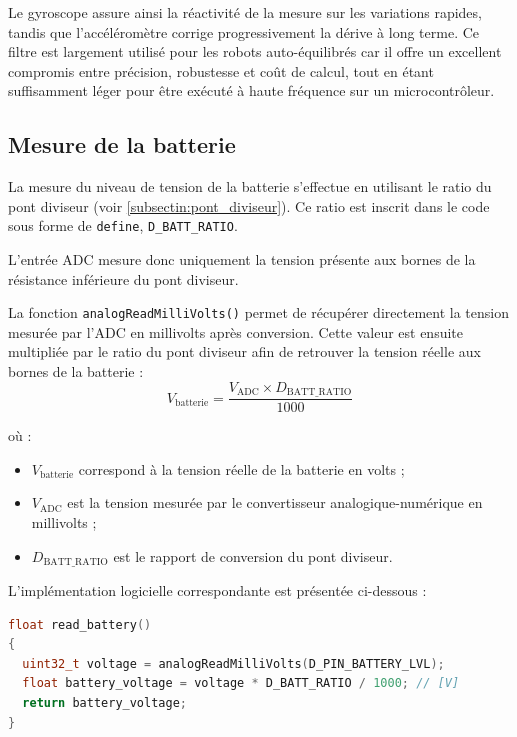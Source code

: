 Le gyroscope assure ainsi la réactivité de la mesure sur les variations rapides, tandis que l'accéléromètre corrige progressivement la dérive à long terme. Ce filtre est largement utilisé pour les robots auto-équilibrés car il offre un excellent compromis entre précision, robustesse et coût de calcul, tout en étant suffisamment léger pour être exécuté à haute fréquence sur un microcontrôleur.

\subsection{Mesure de la batterie}

La mesure du niveau de tension de la batterie s'effectue en utilisant le ratio du pont diviseur (voir \ref{subsectin:pont_diviseur}). Ce ratio est inscrit dans le code sous forme de \texttt{define}, \texttt{D\_BATT\_RATIO}.

L'entrée ADC mesure donc uniquement la tension présente aux bornes de la résistance inférieure du pont diviseur. 

La fonction \texttt{analogReadMilliVolts()} permet de récupérer directement la tension mesurée par l'ADC en millivolts après conversion. Cette valeur est ensuite multipliée par le ratio du pont diviseur afin de retrouver la tension réelle aux bornes de la batterie :
\begin{equation}
    V_{\mathrm{batterie}} = \frac{V_{\mathrm{ADC}} \times D_{\mathrm{BATT\_RATIO}}}{1000}
\end{equation}

où :
\begin{itemize}
    \item $V_{\mathrm{batterie}}$ correspond à la tension réelle de la batterie en volts ;
    \item $V_{\mathrm{ADC}}$ est la tension mesurée par le convertisseur analogique-numérique en millivolts ;
    \item $D_{\mathrm{BATT\_RATIO}}$ est le rapport de conversion du pont diviseur.
\end{itemize}

L'implémentation logicielle correspondante est présentée ci-dessous :

\begin{lstlisting}[language=C++, caption={Mesure de la tension batterie}, label={lst:battery_measurement}]
float read_battery()
{
  uint32_t voltage = analogReadMilliVolts(D_PIN_BATTERY_LVL);
  float battery_voltage = voltage * D_BATT_RATIO / 1000; // [V]
  return battery_voltage;
}
\end{lstlisting}

